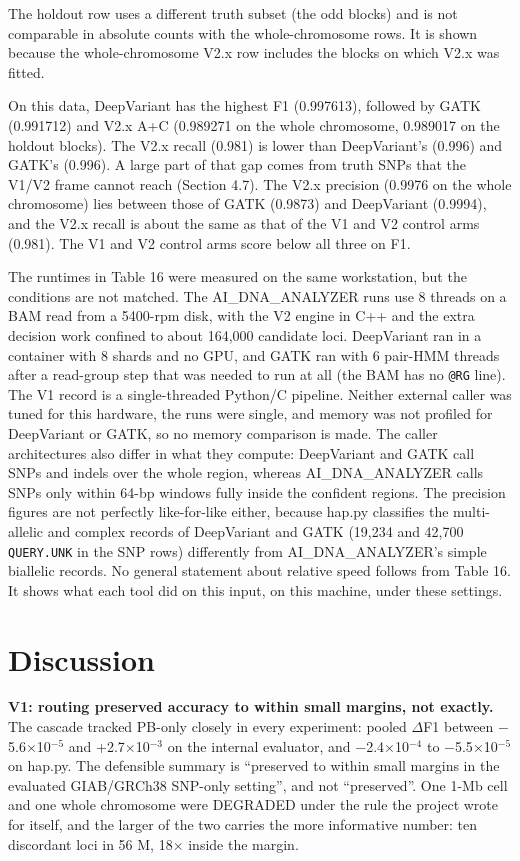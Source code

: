 \documentclass[11pt,a4paper]{article}
\makeatletter
\newcommand{\needspace}[1]{\par\ifdim\pagegoal=\maxdimen\else\dimen@=\pagegoal\advance\dimen@-\pagetotal\ifdim\dimen@<#1\relax\newpage\fi\fi}
\makeatother
\begin{document}
The holdout row uses a different truth subset (the odd blocks) and is not comparable in absolute counts with the whole-chromosome rows. It is shown because the whole-chromosome V2.x row includes the blocks on which V2.x was fitted.

On this data, DeepVariant has the highest F1 (0.997613), followed by GATK (0.991712) and V2.x A+C (0.989271 on the whole chromosome, 0.989017 on the holdout blocks). The V2.x recall (0.981) is lower than DeepVariant's (0.996) and GATK's (0.996). A large part of that gap comes from truth SNPs that the V1/V2 frame cannot reach (Section 4.7). The V2.x precision (0.9976 on the whole chromosome) lies between those of GATK (0.9873) and DeepVariant (0.9994), and the V2.x recall is about the same as that of the V1 and V2 control arms (0.981). The V1 and V2 control arms score below all three on F1.

The runtimes in Table 16 were measured on the same workstation, but the conditions are not matched. The AI\_DNA\_ANALYZER runs use 8 threads on a BAM read from a 5400-rpm disk, with the V2 engine in C++ and the extra decision work confined to about 164,000 candidate loci. DeepVariant ran in a container with 8 shards and no GPU, and GATK ran with 6 pair-HMM threads after a read-group step that was needed to run at all (the BAM has no \texttt{@RG} line). The V1 record is a single-threaded Python/C pipeline. Neither external caller was tuned for this hardware, the runs were single, and memory was not profiled for DeepVariant or GATK, so no memory comparison is made. The caller architectures also differ in what they compute: DeepVariant and GATK call SNPs and indels over the whole region, whereas AI\_DNA\_ANALYZER calls SNPs only within 64-bp windows fully inside the confident regions. The precision figures are not perfectly like-for-like either, because hap.py classifies the multi-allelic and complex records of DeepVariant and GATK (19,234 and 42,700 \texttt{QUERY.\allowbreak{}UNK} in the SNP rows) differently from AI\_DNA\_ANALYZER's simple biallelic records. No general statement about relative speed follows from Table 16. It shows what each tool did on this input, on this machine, under these settings.

\FloatBarrier
\needspace{10\baselineskip}
\section{\texorpdfstring{Discussion}{Discussion}}
\textbf{V1: routing preserved accuracy to within small margins, not exactly.} The cascade tracked PB-only closely in every experiment: pooled $\Delta$F1 between $-$5.6$\times$10$^{-5}$ and +2.7$\times$10$^{-3}$ on the internal evaluator, and $-$2.4$\times$10$^{-4}$ to $-$5.5$\times$10$^{-5}$ on hap.py. The defensible summary is ``preserved to within small margins in the evaluated GIAB/GRCh38 SNP-only setting'', and not ``preserved''. One 1-Mb cell and one whole chromosome were DEGRADED under the rule the project wrote for itself, and the larger of the two carries the more informative number: ten discordant loci in 56 M, 18$\times$ inside the margin.
\end{document}

